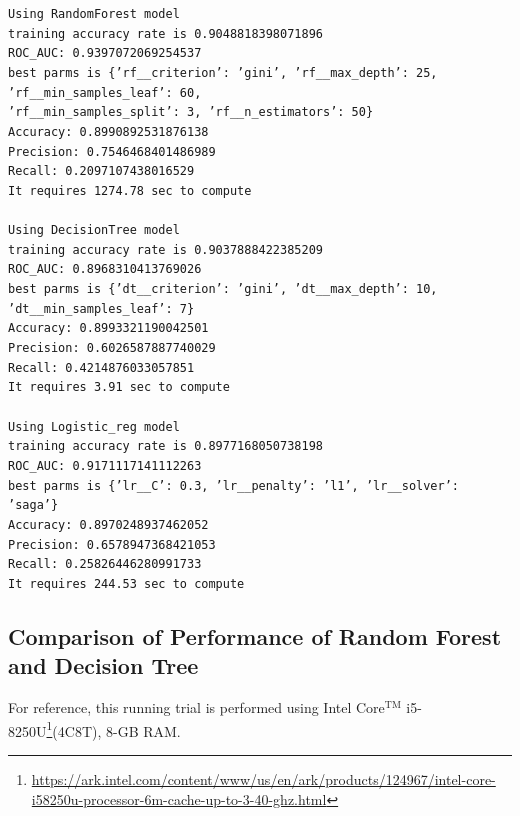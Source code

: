 \documentclass[11pt,a4paper]{article}
\begin{document}
    \noindent
    \texttt{Using RandomForest model \\
    training accuracy rate is 0.9048818398071896 \\
    ROC\_AUC: 0.9397072069254537 \\
    best parms is \{'rf\_\_criterion': 'gini', 'rf\_\_max\_depth': 25, 'rf\_\_min\_samples\_leaf': 60, \\ 'rf\_\_min\_samples\_split': 3, 'rf\_\_n\_estimators': 50\} \\
    Accuracy: 0.8990892531876138 \\
    Precision: 0.7546468401486989 \\
    Recall: 0.2097107438016529 \\
    It requires 1274.78 sec to compute \\
    \\
    Using DecisionTree model \\
    training accuracy rate is 0.9037888422385209 \\
    ROC\_AUC: 0.8968310413769026 \\
    best parms is \{'dt\_\_criterion': 'gini', 'dt\_\_max\_depth': 10, 'dt\_\_min\_samples\_leaf': 7\} \\
    Accuracy: 0.8993321190042501 \\
    Precision: 0.6026587887740029 \\
    Recall: 0.4214876033057851 \\
    It requires 3.91 sec to compute \\
    \\
    Using Logistic\_reg model \\
    training accuracy rate is 0.8977168050738198 \\
    ROC\_AUC: 0.9171117141112263 \\
    best parms is \{'lr\_\_C': 0.3, 'lr\_\_penalty': 'l1', 'lr\_\_solver': 'saga'\} \\
    Accuracy: 0.8970248937462052 \\
    Precision: 0.6578947368421053 \\
    Recall: 0.25826446280991733 \\
    It requires 244.53 sec to compute}
    

    \subsection{Comparison of Performance of Random Forest and Decision Tree}
    For reference, this running trial is performed using Intel Core$^{\text{TM}}$ i5-8250U\footnote{\url{https://ark.intel.com/content/www/us/en/ark/products/124967/intel-core-i58250u-processor-6m-cache-up-to-3-40-ghz.html}}(4C8T), 8-GB RAM.
    
\end{document}
